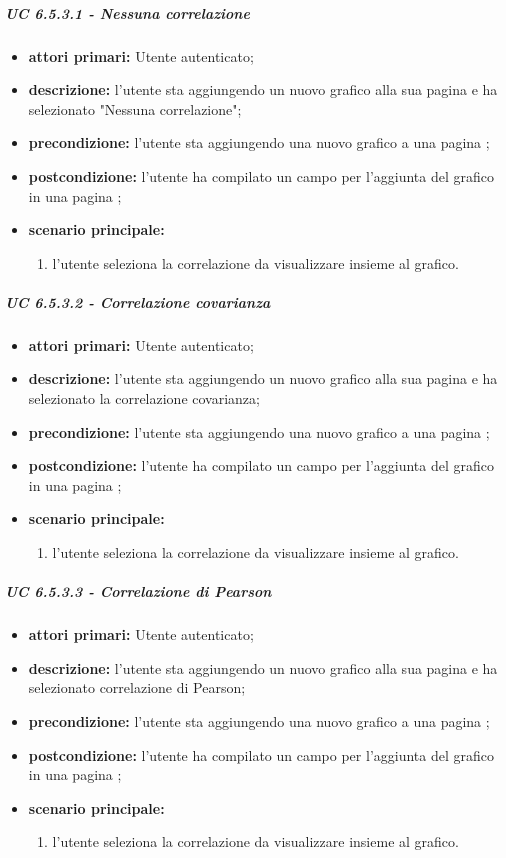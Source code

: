 			\subparagraph{UC 6.5.3.1 - Nessuna correlazione}
			\begin{itemize}
				\item \textbf{attori primari:} Utente autenticato;
				\item \textbf{descrizione:} l'utente sta aggiungendo un nuovo grafico alla sua pagina  e ha selezionato "Nessuna correlazione";
				\item \textbf{precondizione:} l'utente sta aggiungendo una nuovo grafico a una pagina ;
				\item \textbf{postcondizione:} l'utente ha compilato un campo per l'aggiunta del grafico in una pagina ;
				\item \textbf{scenario principale:}
				\begin{enumerate}
					\item{l'utente seleziona la correlazione da visualizzare insieme al grafico.}
				\end{enumerate}	
			\end{itemize}

			\subparagraph{UC 6.5.3.2 - Correlazione covarianza}
			\begin{itemize}
				\item \textbf{attori primari:} Utente autenticato;
				\item \textbf{descrizione:} l'utente sta aggiungendo un nuovo grafico alla sua pagina  e ha selezionato la correlazione covarianza;
				\item \textbf{precondizione:} l'utente sta aggiungendo una nuovo grafico a una pagina ;
				\item \textbf{postcondizione:} l'utente ha compilato un campo per l'aggiunta del grafico in una pagina ;
				\item \textbf{scenario principale:}
				\begin{enumerate}
					\item{l'utente seleziona la correlazione da visualizzare insieme al grafico.}
				\end{enumerate}	
			\end{itemize}

			\subparagraph{UC 6.5.3.3 - Correlazione di Pearson}
			\begin{itemize}
				\item \textbf{attori primari:} Utente autenticato;
				\item \textbf{descrizione:} l'utente sta aggiungendo un nuovo grafico alla sua pagina  e ha selezionato correlazione di Pearson;
				\item \textbf{precondizione:} l'utente sta aggiungendo una nuovo grafico a una pagina ;
				\item \textbf{postcondizione:} l'utente ha compilato un campo per l'aggiunta del grafico in una pagina ;
				\item \textbf{scenario principale:}
				\begin{enumerate}
					\item{l'utente seleziona la correlazione da visualizzare insieme al grafico.}
				\end{enumerate}	
			\end{itemize}

